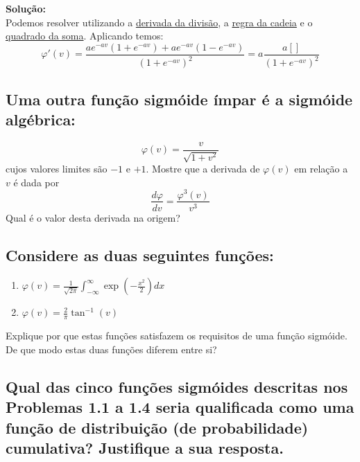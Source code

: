 \documentclass[12pt, openright, a4paper, twoside, english, brazil]{article}
\newenvironment{solution}{\color{red}\noindent\textbf{Solução:}\\}{\color{black}}
\newcommand{\df}[2]{\frac{d#1}{d#2}}
\newcommand{\ghlink}[2]{\href{https://github.com/dreisss/study-notes/blob/main/#1}{#2}}
\newcommand{\difflink}[1]{\ghlink{Differentiation/Real/Abstract_pt.pdf}{#1}}
\begin{document}
\begin{solution}

  Podemos resolver utilizando a \difflink{derivada da divisão}, a
  \difflink{regra da cadeia} e o
  \ghlink{/BasicAlgebra/SpecialProducts.pdf}{quadrado da soma}.
  Aplicando temos:
  $$\varphi'(v)=\frac{ae^{-av}(1+e^{-av})+ae^{-av}(1-e^{-av})}{(1+e^{-av})^2}=a\frac{a[]}{(1+e^{-av})^2}$$

\end{solution}

\subsection{Uma outra função sigmóide ímpar é a sigmóide algébrica:}
$$
\varphi(v)=\frac v{\sqrt{1+v^2}}
$$
cujos valores limites são $-1$ e $+1$. Mostre que a derivada de
$\varphi(v)$ em relação a $v$ é dada por
$$
\df{\varphi}{v}=\frac{\varphi^3(v)}{v^3}
$$
Qual é o valor desta derivada na origem?

\subsection{Considere as duas seguintes funções:}
\begin{enumerate}[\bfseries (i)]
  \item
    $\displaystyle\varphi(v)=\frac1{\sqrt{2\pi}}\int_{-\infty}^{\infty}\exp(-\frac{x^2}{2})dx$

  \item $\displaystyle\varphi(v)=\frac2\pi\tan^{-1}(v)$
\end{enumerate}
Explique por que estas funções satisfazem os requisitos de uma
função sigmóide. De que modo estas duas funções diferem entre si?

\subsection{Qual das cinco funções sigmóides descritas nos Problemas
  1.1 a 1.4 seria qualificada como uma função de distribuição (de
  probabilidade) cumulativa? Justifique a sua resposta.
}
\end{document}
